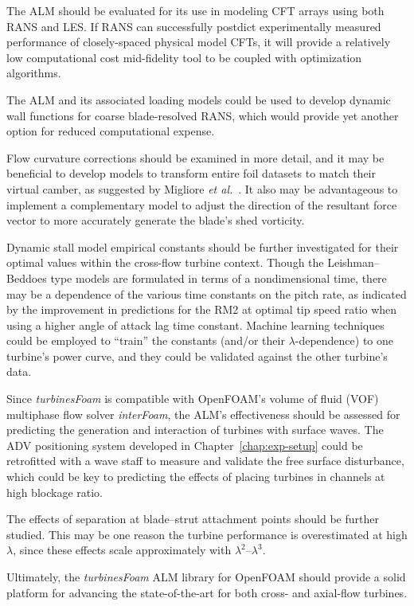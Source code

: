 The ALM should be evaluated for its use in modeling CFT arrays using both RANS
and LES. If RANS can successfully postdict experimentally measured performance
of closely-spaced physical model CFTs, it will provide a relatively low
computational cost mid-fidelity tool to be coupled with optimization algorithms.

The ALM and its associated loading models could be used to develop dynamic wall
functions for coarse blade-resolved RANS, which would provide yet another option
for reduced computational expense.

Flow curvature corrections should be examined in more detail, and it may be
beneficial to develop models to transform entire foil datasets to match their
virtual camber, as suggested by Migliore \emph{et al.}~\cite{Migliore1980}. It
also may be advantageous to implement a complementary model to adjust the
direction of the resultant force vector to more accurately generate the blade's
shed vorticity.

Dynamic stall model empirical constants should be further investigated for their
optimal values within the cross-flow turbine context. Though the
Leishman--Beddoes type models are formulated in terms of a nondimensional time,
there may be a dependence of the various time constants on the pitch rate, as
indicated by the improvement in predictions for the RM2 at optimal tip speed
ratio when using a higher angle of attack lag time constant. Machine learning
techniques could be employed to ``train'' the constants (and/or their
$\lambda$-dependence) to one turbine's power curve, and they could be validated
against the other turbine's data.

Since \textit{turbinesFoam} is compatible with OpenFOAM's volume of fluid (VOF)
multiphase flow solver \textit{interFoam}, the ALM's effectiveness should be
assessed for predicting the generation and interaction of turbines with surface
waves. The ADV positioning system developed in Chapter~\ref{chap:exp-setup}
could be retrofitted with a wave staff to measure and validate the free surface
disturbance, which could be key to predicting the effects of placing turbines in
channels at high blockage ratio.

The effects of separation at blade--strut attachment points should be further
studied. This may be one reason the turbine performance is overestimated at high
$\lambda$, since these effects scale approximately with
$\lambda^2$--$\lambda^3$.

Ultimately, the \textit{turbinesFoam} ALM library for OpenFOAM should provide a
solid platform for advancing the state-of-the-art for both cross- and axial-flow
turbines.


